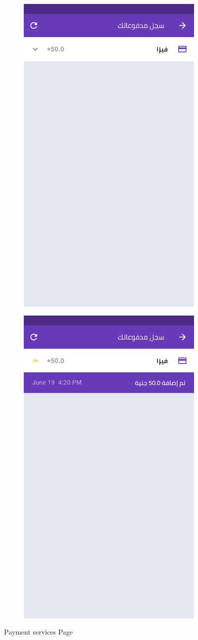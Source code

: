     \begin{figure}[H] 

    \begin{subfigure}[b]{0.5\linewidth}
    \centering
    \includegraphics[width=0.5\linewidth]{images/ch3/payment/Adding Credit/4.png}
  \end{subfigure}%
   \begin{subfigure}[b]{0.5\linewidth}
    \centering
    \includegraphics[width=0.5\linewidth]{images/ch3/payment/Adding Credit/5.png}
  
  \end{subfigure}%
    \caption{ Payment services Page}

  \end{figure}
